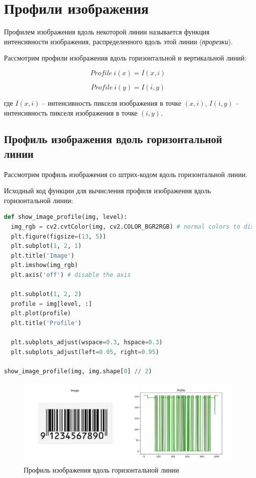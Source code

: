 \section{Профили изображения}

Профилем изображения вдоль некоторой линии называется функция интенсивности изображения, распределенного вдоль этой линии (\textit{прорезки}).

Рассмотрим профили изображения вдоль горизонтальной и вертикальной линий: 

\begin{equation}
  Profile~i(x) = I(x, i)
\end{equation}
  
\begin{equation}
  Profile~i(y) = I(i, y)
\end{equation}

где $I(x, i)$ -- интенсивность пикселя изображения в точке $(x, i)$, $I(i, y)$ -- интенсивность пикселя изображения в точке $(i, y)$.

\subsection{Профиль изображения вдоль горизонтальной линии}

Рассмотрим профиль изображения со штрих-кодом вдоль горизонтальной линии.

Исходный код функции для вычисления профиля изображения вдоль горизонтальной линии:

\begin{lstlisting}[language=Python]
def show_image_profile(img, level):
  img_rgb = cv2.cvtColor(img, cv2.COLOR_BGR2RGB) # normal colors to display
  plt.figure(figsize=(13, 5))
  plt.subplot(1, 2, 1)
  plt.title('Image')
  plt.imshow(img_rgb)
  plt.axis('off') # disable the axis

  plt.subplot(1, 2, 2)
  profile = img[level, :]
  plt.plot(profile)
  plt.title('Profile')

  plt.subplots_adjust(wspace=0.3, hspace=0.3)
  plt.subplots_adjust(left=0.05, right=0.95)

show_image_profile(img, img.shape[0] // 2)
\end{lstlisting}

\begin{figure}[H]
    \centering
    \includegraphics[width=\textwidth]{../results/Profile.png}
    \caption{Профиль изображения вдоль горизонтальной линии}
    \label{fig:profile}
\end{figure}

